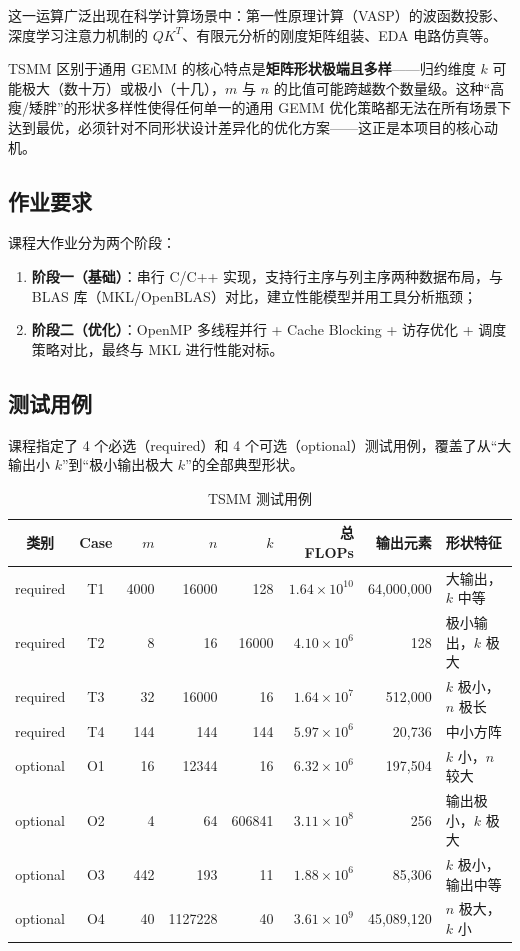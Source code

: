 \documentclass[11pt,a4paper,fontset=fandol]{ctexart}
\begin{document}
这一运算广泛出现在科学计算场景中：第一性原理计算（VASP）的波函数投影、深度学习注意力机制的 $QK^{T}$、有限元分析的刚度矩阵组装、EDA 电路仿真等。

TSMM 区别于通用 GEMM 的核心特点是\textbf{矩阵形状极端且多样}——归约维度 $k$ 可能极大（数十万）或极小（十几），$m$ 与 $n$ 的比值可能跨越数个数量级。这种“高瘦/矮胖”的形状多样性使得任何单一的通用 GEMM 优化策略都无法在所有场景下达到最优，必须针对不同形状设计差异化的优化方案——这正是本项目的核心动机。

\subsection{作业要求}
课程大作业分为两个阶段：
\begin{enumerate}[leftmargin=2.4em]
  \item \textbf{阶段一（基础）}：串行 C/C++ 实现，支持行主序与列主序两种数据布局，与 BLAS 库（MKL/OpenBLAS）对比，建立性能模型并用工具分析瓶颈；
  \item \textbf{阶段二（优化）}：OpenMP 多线程并行 + Cache Blocking + 访存优化 + 调度策略对比，最终与 MKL 进行性能对标。
\end{enumerate}

\subsection{测试用例}
课程指定了 4 个必选（required）和 4 个可选（optional）测试用例，覆盖了从“大输出小 $k$”到“极小输出极大 $k$”的全部典型形状。

\begin{table}[H]
\centering
\caption{TSMM 测试用例}
\small
\begin{tabular}{ccrrrrrl}
\toprule
类别 & Case & $m$ & $n$ & $k$ & 总 FLOPs & 输出元素 & 形状特征 \\
\midrule
required & T1 & 4000 & 16000 & 128 & $1.64\!\times\!10^{10}$ & 64{,}000{,}000 & 大输出，$k$ 中等 \\
required & T2 & 8 & 16 & 16000 & $4.10\!\times\!10^{6}$ & 128 & 极小输出，$k$ 极大 \\
required & T3 & 32 & 16000 & 16 & $1.64\!\times\!10^{7}$ & 512{,}000 & $k$ 极小，$n$ 极长 \\
required & T4 & 144 & 144 & 144 & $5.97\!\times\!10^{6}$ & 20{,}736 & 中小方阵 \\
optional & O1 & 16 & 12344 & 16 & $6.32\!\times\!10^{6}$ & 197{,}504 & $k$ 小，$n$ 较大 \\
optional & O2 & 4 & 64 & 606841 & $3.11\!\times\!10^{8}$ & 256 & 输出极小，$k$ 极大 \\
optional & O3 & 442 & 193 & 11 & $1.88\!\times\!10^{6}$ & 85{,}306 & $k$ 极小，输出中等 \\
optional & O4 & 40 & 1127228 & 40 & $3.61\!\times\!10^{9}$ & 45{,}089{,}120 & $n$ 极大，$k$ 小 \\
\bottomrule
\end{tabular}
\end{table}
\end{document}
